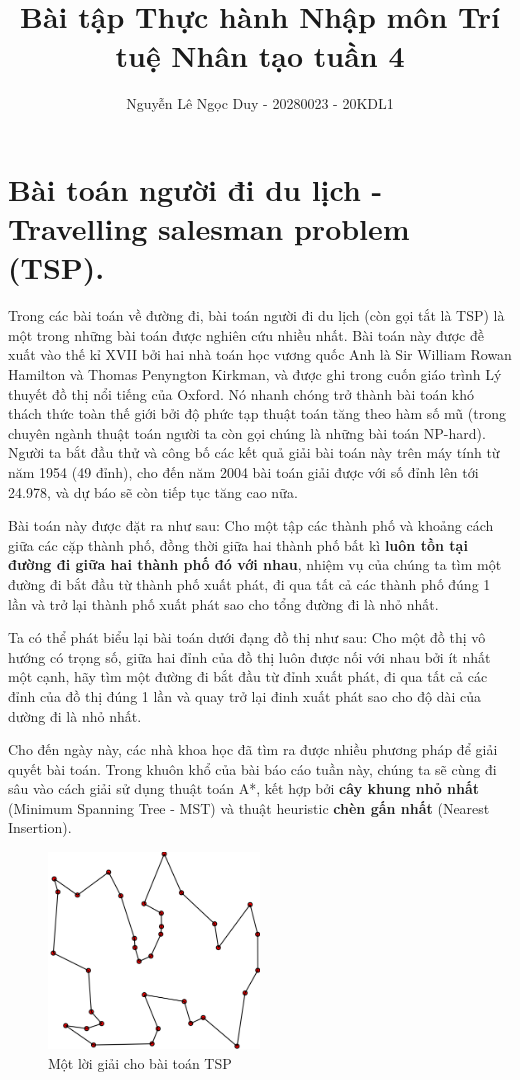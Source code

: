 \documentclass[a4paper, 11pt]{article}
\title{\textbf{Bài tập Thực hành Nhập môn Trí tuệ Nhân tạo tuần 4}}
\author{Nguyễn Lê Ngọc Duy - 20280023 - 20KDL1}
\date{}
\begin{document}
\maketitle
\hypersetup{linkcolor=black}
\tableofcontents
\clearpage

\section{Bài toán người đi du lịch - Travelling salesman problem (TSP).}

Trong các bài toán về đường đi, bài toán người đi du lịch (còn gọi tắt là TSP) là một trong những bài toán được nghiên cứu nhiều nhất. Bài toán này được đề xuất vào thế kỉ XVII bởi hai nhà toán học vương quốc Anh là Sir William Rowan Hamilton và Thomas Penyngton Kirkman, và được ghi trong cuốn giáo trình Lý thuyết đồ thị nổi tiếng của Oxford. Nó nhanh chóng trở thành bài toán khó thách thức toàn thế giới bởi độ phức tạp thuật toán tăng theo hàm số mũ (trong chuyên ngành thuật toán người ta còn gọi chúng là những bài toán NP-hard). Người ta bắt đầu thử và công bố các kết quả giải bài toán này trên máy tính từ năm 1954 (49 đỉnh), cho đến năm 2004 bài toán giải được với số đỉnh lên tới 24.978, và dự báo sẽ còn tiếp tục tăng cao nữa.

Bài toán này được đặt ra như sau: Cho một tập các thành phố và khoảng cách giữa các cặp thành phố, đồng thời giữa hai thành phố bất kì \textbf{luôn tồn tại đường đi giữa hai thành phố đó với nhau}, nhiệm vụ của chúng ta tìm một đường đi bắt đầu từ thành phố xuất phát, đi qua tất cả các thành phố đúng 1 lần và trở lại thành phố xuất phát sao cho tổng đường đi là nhỏ nhất.

Ta có thể phát biểu lại bài toán dưới đạng đồ thị như sau: Cho một đồ thị vô hướng có trọng số, giữa hai đỉnh của đồ thị luôn được nối với nhau bởi ít nhất một cạnh, hãy tìm một đường đi bắt đầu từ đỉnh xuất phát, đi qua tất cả các đỉnh của đồ thị đúng 1 lần và quay trở lại đinh xuất phát sao cho độ dài của dường đi là nhỏ nhất.

Cho đến ngày này, các nhà khoa học đã tìm ra được nhiều phương pháp để giải quyết bài toán. Trong khuôn khổ của bài báo cáo tuần này, chúng ta sẽ cùng đi sâu vào cách giải sử dụng thuật toán A*, kết hợp bởi \textbf{cây khung nhỏ nhất} (Minimum Spanning Tree - MST) và thuật heuristic \textbf{chèn gấn nhất} (Nearest Insertion).

\begin{figure}[h]
  \centering
  \includegraphics[width=0.5\textwidth, height=0.5\textheight,keepaspectratio]{TSP.png}
  \caption{Một lời giải cho bài toán TSP}
\end{figure}
\end{document}
